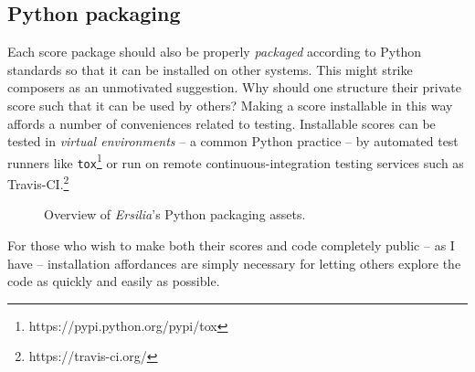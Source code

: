
\subsection{Python packaging}
\label{ssec:python-packaging}

Each score package should also be properly \emph{packaged} according to Python
standards so that it can be installed on other systems. This might strike
composers as an unmotivated suggestion. Why should one structure their private
score such that it can be used by others? Making a score installable in this
way affords a number of conveniences related to testing. Installable scores can
be tested in \emph{virtual environments} -- a common Python practice -- by
automated test runners like
\texttt{tox}\footnote{https://pypi.python.org/pypi/tox} or run on remote
continuous-integration testing services such as
Travis-CI.\footnote{https://travis-ci.org/}

\begin{figure}[h!]
\begin{singlespacing}
\vspace{-0.5\baselineskip}
\end{singlespacing}
\caption{Overview of \emph{Ersilia}'s Python packaging assets.}
\end{figure}

For those who wish to make both their scores and code completely public -- as I
have -- installation affordances are simply necessary for letting others
explore the code as quickly and easily as possible.

